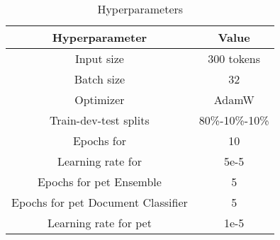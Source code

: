 
\begin{table}%
    \centering
    \begin{tabular}{c|c}
      \hline
      \textbf{Hyperparameter} & \textbf{Value} \\ \hline
      Input size   &  300 tokens \\
      Batch size & 32 \\
      Optimizer & AdamW \\
      Train-dev-test splits & 80\%-10\%-10\% \\ \hline
      Epochs for \finetuning{} & 10 \\
      Learning rate for \finetuning{} & 5e-5 \\ \hline
      Epochs for \gls{pet} Ensemble & 5\\
      Epochs for \gls{pet} Document Classifier  & 5\\
      Learning rate for \gls{pet} & 1e-5 \\ \hline
    \end{tabular}
    \caption{Hyperparameters}
    \label{tab:06_hyperparameters}
\end{table}
